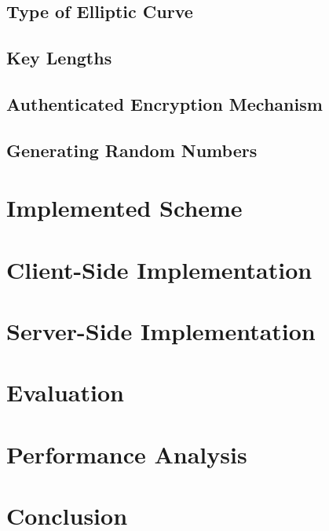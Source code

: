\subsection{Type of Elliptic Curve}
\subsection{Key Lengths}
\subsection{Authenticated Encryption Mechanism}
\subsection{Generating Random Numbers}

\section{Implemented Scheme}

\section{Client-Side Implementation}

\section{Server-Side Implementation}

\section{Evaluation}

\section{Performance Analysis}

\section{Conclusion}

